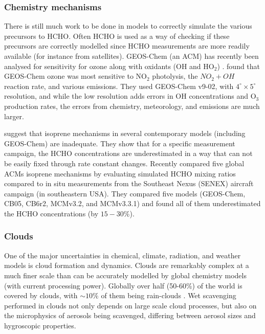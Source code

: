     \subsubsection{Chemistry mechanisms}
      There is still much work to be done in models to correctly simulate the various precursors to HCHO.
      Often HCHO is used as a way of checking if these precursors are correctly modelled since HCHO measurements are more readily available (for instance from satellites).
      GEOS-Chem (an ACM) has recently been analysed for sensitivity for ozone along with oxidants (OH and HO$_2$) \citep{Christian2017}.
      \cite{Christian2017} found that GEOS-Chem ozone was most sensitive to NO$_2$ photolysis, the $NO_2 + OH$ reaction rate, and various emissions.
      They used GEOS-Chem v9-02, with $4^{\circ} \times 5^{\circ}$ resolution, and while the low resolution adds errors in OH concentrations and O$_3$ production rates, the errors from chemistry, meteorology, and emissions are much larger.

      \citet{Marvin2017} suggest that isoprene mechanisms in several contemporary models (including GEOS-Chem) are inadequate. 
      They show that for a specific measurement campaign, the HCHO concentrations are underestimated in a way that can not be easily fixed through rate constant changes.
      Recently \cite{Marvin2017} compared five global ACMs isoprene mechanisms by evaluating simulated HCHO mixing ratios compared to in situ measurements from the Southeast Nexus (SENEX) aircraft campaign (in southeastern USA).
      They compared five models (GEOS-Chem, CB05, CB6r2, MCMv3.2, and MCMv3.3.1) and found all of them underestimated the HCHO concentrations (by $15 - 30\%$).
    
    \subsubsection{Clouds}
      \label{LR:sec:ModelUncertaintyClouds}
      One of the major uncertainties in chemical, climate, radiation, and weather models is cloud formation and dynamics. 
      Clouds are remarkably complex at a much finer scale than can be accurately modelled by global chemistry models (with current processing power).
      Globally over half (50-60\%) of the world is covered by clouds, with $\sim10\%$ of them being rain-clouds \citep{Kanakidou2005}.
      Wet scavenging performed in clouds not only depends on large scale cloud processes, but also on the microphysics of aerosols being scavenged, differing between aerosol sizes and hygroscopic properties.
      
